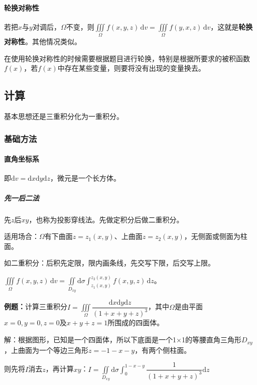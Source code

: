 \documentclass[UTF8, 12pt]{ctexart}
\begin{document}
\paragraph{轮换对称性} \leavevmode \medskip

若把$x$与$y$对调后，$\Omega$不变，则$\iiint\limits_\Omega f(x,y,z)\,\textrm{d}v=\iiint\limits_\Omega f(y,x,z)\,\textrm{d}v$，这就是\textbf{轮换对称性}。其他情况类似。

在使用轮换对称性的时候需要根据题目进行轮换，特别是根据所要求的被积函数$f(x)$，若$f(x)$中存在某些变量，则要将没有出现的变量换去。

\subsection{计算}

基本思想还是三重积分化为一重积分。

\subsubsection{基础方法}

\paragraph{直角坐标系} \leavevmode \medskip

即$\textrm{d}v=\textrm{d}x\textrm{d}y\textrm{d}z$，微元是一个长方体。

\subparagraph{先一后二法} \leavevmode \medskip

先$z$后$xy$，也称为投影穿线法。先做定积分后做二重积分。

适用场合：$\Omega$有下曲面$z=z_1(x,y)$、上曲面$z=z_2(x,y)$，无侧面或侧面为柱面。

如二重积分：后积先定限，限内画条线，先交写下限，后交写上限。

$\iiint\limits_\Omega f(x,y,z)\,\textrm{d}v=\iint\limits_{D_{xy}}\textrm{d}\sigma\int_{z_1(x,y)}^{z_2(x,y)}f(x,y,z)\,\textrm{d}z$。

\textbf{例题：}计算三重积分$I=\displaystyle{\iiint\limits_\Omega\dfrac{\textrm{d}x\textrm{d}y\textrm{d}z}{(1+x+y+z)^3}}$，其中$\Omega$是由平面$x=0,y=0,z=0$及$x+y+z=1$所围成的四面体。

解：根据图形，已知是一个四面体，所以下底面是一个1×1的等腰直角三角形$D_{xy}$，上曲面为一个等边三角形$z=-1-x-y$，有两个侧柱面。

则先将$I$消去$z$，再计算$xy$：$I=\displaystyle{\iint\limits_{D_{xy}}\textrm{d}\sigma\int_0^{1-x-y}\dfrac{1}{(1+x+y+z)^3}\textrm{d}z}$
\end{document}
